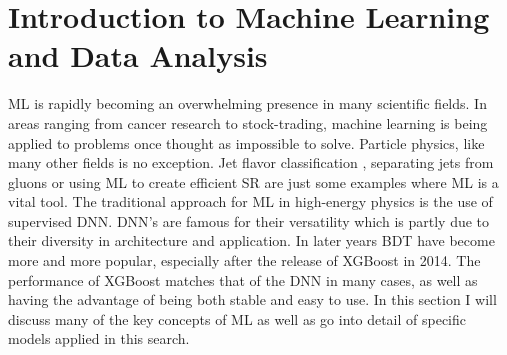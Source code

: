 \chapter{Introduction to Machine Learning and Data Analysis}\label{chap:Intro ML}
\ac{ML} is rapidly becoming an overwhelming presence in many scientific fields.
In areas ranging from cancer research to stock-trading, machine learning is being applied to problems
once thought as impossible to solve. Particle physics, like many other fields is no exception. Jet flavor classification \cite{Guest_2016}, 
separating jets from gluons \cite{PhysRevD.44.2025} or using \ac{ML} to create efficient \ac{SR} are just some examples
where \ac{ML} is a vital tool. The traditional approach for ML in high-energy physics is the use of supervised
\ac{DNN}. \ac{DNN}'s are famous for their versatility which is partly due to their diversity in architecture and 
application. In later years \ac{BDT} have become more and more popular, especially after the release of XGBoost 
in 2014. The performance of XGBoost matches that of the \ac{DNN} in many cases, as well as having the advantage 
of being both stable and easy to use. In this section I will discuss many of the key concepts of \ac{ML} as 
well as go into detail of specific models applied in this search.

